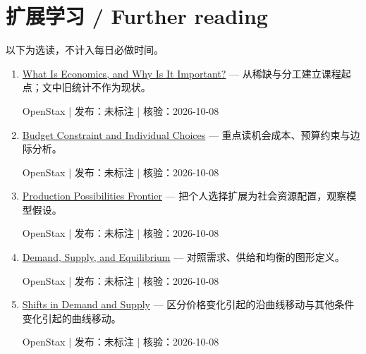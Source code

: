 \documentclass[11pt]{article}
\newcommand{\Needspace}[1]{\par\ifdim\dimexpr\pagegoal-\pagetotal\relax<#1\relax\newpage\fi}
\begin{document}
\Needspace{6\baselineskip}\section*{扩展学习 / Further reading}\small 以下为选读，不计入每日必做时间。\begin{enumerate}[leftmargin=1.6em]

\item [S1] \href{https://openstax.org/books/principles-economics-3e/pages/1-1-what-is-economics-and-why-is-it-important}{What Is Economics, and Why Is It Important?} — 从稀缺与分工建立课程起点；文中旧统计不作为现状。\par OpenStax | 发布：未标注 | 核验：2026-10-08

\item [S2] \href{https://openstax.org/books/principles-economics-3e/pages/2-1-how-individuals-make-choices-based-on-their-budget-constraint}{Budget Constraint and Individual Choices} — 重点读机会成本、预算约束与边际分析。\par OpenStax | 发布：未标注 | 核验：2026-10-08

\item [S3] \href{https://openstax.org/books/principles-economics-3e/pages/2-2-the-production-possibilities-frontier-and-social-choices}{Production Possibilities Frontier} — 把个人选择扩展为社会资源配置，观察模型假设。\par OpenStax | 发布：未标注 | 核验：2026-10-08

\item [S4] \href{https://openstax.org/books/principles-economics-3e/pages/3-1-demand-supply-and-equilibrium-in-markets-for-goods-and-services}{Demand, Supply, and Equilibrium} — 对照需求、供给和均衡的图形定义。\par OpenStax | 发布：未标注 | 核验：2026-10-08

\item [S5] \href{https://openstax.org/books/principles-economics-3e/pages/3-2-shifts-in-demand-and-supply-for-goods-and-services}{Shifts in Demand and Supply} — 区分价格变化引起的沿曲线移动与其他条件变化引起的曲线移动。\par OpenStax | 发布：未标注 | 核验：2026-10-08

\end{enumerate}
\end{document}
